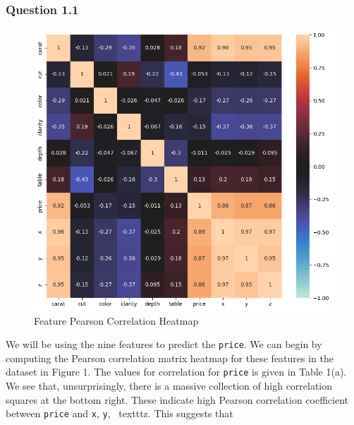 \documentclass[11pt,letterpaper]{article}
\begin{document}

\subsubsection*{Question 1.1}
\begin{figure}[H]
    \centering
   \includegraphics[width=0.5\linewidth]{../Figures/Question-1/datasetCorrHeatmap.png}
   \caption{Feature Pearson Correlation Heatmap}
   \label{fig:corr_hm}
\end{figure}

We will be using the nine features to predict the \texttt{price}. We can begin by 
computing the Pearson correlation matrix heatmap for these features in 
the dataset in Figure 1. The values for correlation for \texttt{price} is given in 
Table 1(a). We see that, unsurprisingly, there is a massive collection of high 
correlation squares at the bottom right. These indicate high Pearson 
correlation coefficient between \texttt{price} and \texttt{x}, \texttt{y}, 
\ texttt{z}. This suggests that 

\end{document}
